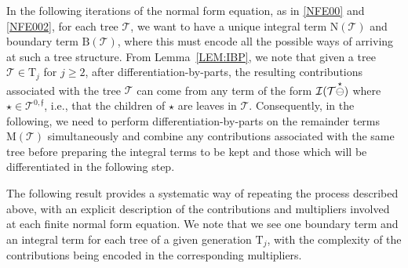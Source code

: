\documentclass[a4paper,
11pt,  reqno]{amsart}
\makeatletter
\newcommand{\5}{\textup{V}}
\theoremstyle{remark}
\newcommand{\TT}{\mathcal{T}}
\newcommand{\Tr}{\mathrm{T}}
\newcommand{\ff}{\mathfrak{f}}
\def\<#1>{\csname MH@symb@#1\endcsname}
\newcommand{\Ical}{\mathcal{I}}
\numberwithin{equation}{section}
\numberwithin{theorem}{section}
\newcommand{\MM}{\mathrm{M}}
\newcommand{\NN}{\mathrm{N}}
\newcommand{\BB}{\mathrm{B}}
\makeatother
\begin{document}
In the following iterations of the normal form equation, as in \eqref{NFE00} and \eqref{NFE002}, for each tree $\TT$, we want to have a unique integral term $\NN(\TT)$ and boundary term $\BB(\TT)$, 
where this must encode all the possible ways of arriving at such a tree structure. 
From Lemma~\ref{LEM:IBP}, we note that given a tree $\TT \in \Tr_j$ for $j\ge2$, after differentiation-by-parts, the resulting contributions associated with the tree $\TT$ can come from any term of the form $\Ical(\TT \overset{\star}{\ominus} \<1>)$ where $\star \in \TT^{0, \ff}$, i.e., that the children of $\star$ are leaves in $\TT$. Consequently, in the following, we need to perform differentiation-by-parts on the remainder terms $\MM(\TT)$ simultaneously and combine any contributions associated with the same tree before preparing the integral terms to be kept and those which will be differentiated in the following step. 

The following result provides a systematic way of repeating the process described above, with an explicit description of the contributions and multipliers involved at each finite normal form equation. 
We note that we see one boundary term and an integral term for each tree of a given generation $\Tr_j$, with the complexity of the contributions being encoded in the corresponding multipliers.
\end{document}
